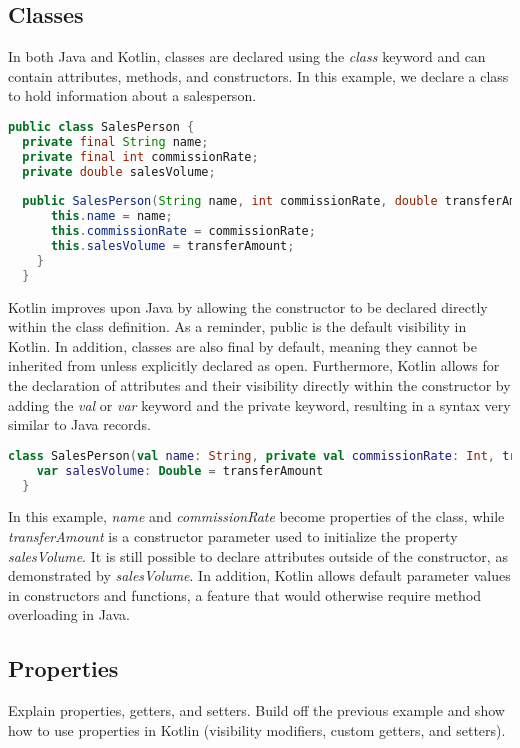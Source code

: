 \documentclass[a4paper, 11pt]{article}
\begin{document}
\subsection{Classes}
In both Java and Kotlin, classes are declared using the \textit{class} keyword and can contain attributes, methods, and constructors. In this example, we declare a class to hold information about a salesperson.

\begin{lstlisting}[language=Java,title={Java Class Declaration}]
public class SalesPerson {
  private final String name;
  private final int commissionRate;
  private double salesVolume;
  
  public SalesPerson(String name, int commissionRate, double transferAmount) {
      this.name = name;
      this.commissionRate = commissionRate;
      this.salesVolume = transferAmount;
    }
  }
\end{lstlisting}
  Kotlin improves upon Java by allowing the constructor to be declared directly within the class definition. As a reminder, public is the default visibility in Kotlin. In addition, classes are also final by default, meaning they cannot be inherited from unless explicitly declared as open.
  Furthermore, Kotlin allows for the declaration of attributes and their visibility directly within the constructor by adding the \textit{val} or \textit{var} keyword and the private keyword, resulting in a syntax very similar to Java records.
\begin{lstlisting}[language=Kotlin,title={Kotlin Class Declaration}]
  class SalesPerson(val name: String, private val commissionRate: Int, transferAmount: Double = 0.0) {
    var salesVolume: Double = transferAmount
  }
\end{lstlisting}
In this example, \textit{name} and \textit{commissionRate} become properties of the class, while \textit{transferAmount} is a constructor parameter used to initialize the property \textit{salesVolume}. It is still possible to declare attributes outside of the constructor, as demonstrated by \textit{salesVolume}. In addition, Kotlin allows default parameter values in constructors and functions, a feature that would otherwise require method overloading in Java.

\subsection{Properties}
  Explain properties, getters, and setters.
  Build off the previous example and show how to use properties in Kotlin (visibility modifiers, custom getters, and setters).
\end{document}
